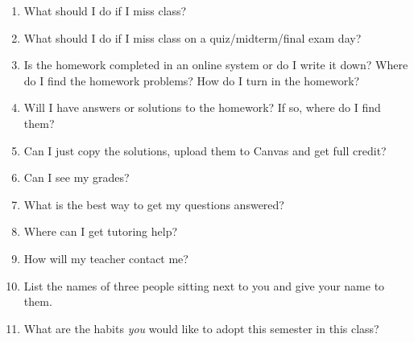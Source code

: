 \documentclass[11pt,fleqn]{article}
\begin{document}
\begin{enumerate}
\item What should I do if I miss class?
\vfill

\item What should I do if I miss class on a quiz/midterm/final exam day?
\vfill
\newpage
\item Is the homework completed in an online system or do I write it down? Where do I find the homework problems? How do I turn in the homework?
\vfill
\item Will I have answers or solutions to the homework? If so, where do I find them?\\
\vfill
\item Can I just copy the solutions, upload them to Canvas and get full credit? \\
\vfill
\item Can I see my grades?\\
\vfill

\item What is the best way to get my questions answered?\\

\vfill

\item Where can I get tutoring help?\\
\vfill
\item How will my teacher contact me? \\
\vfill
\item List the names of three people sitting next to you and give your name to them.
\vfill
\item What are the habits \emph{you} would like to adopt this semester in this class?
\vfill
\end{enumerate}
\end{document}
